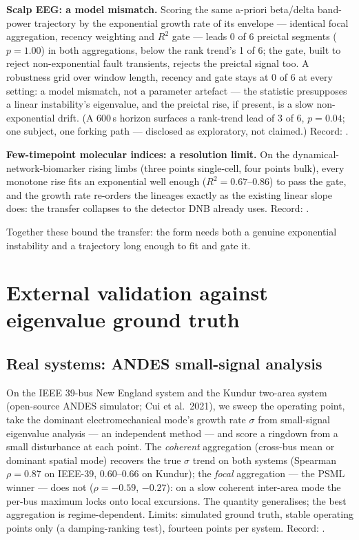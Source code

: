 \documentclass[11pt]{article}
\begin{document}
\textbf{Scalp EEG: a model mismatch.} Scoring the same a-priori
beta/delta band-power trajectory by the exponential growth rate of its
envelope --- identical focal aggregation, recency weighting and $R^2$
gate --- leads 0 of 6 preictal segments ($p = 1.00$) in both
aggregations, below the rank trend's 1 of 6; the gate, built to reject
non-exponential fault transients, rejects the preictal signal too. A
robustness grid over window length, recency and gate stays at 0 of 6 at
every setting: a model mismatch, not a parameter artefact --- the
statistic presupposes a linear instability's eigenvalue, and the
preictal rise, if present, is a slow non-exponential drift. (A 600\,s
horizon surfaces a rank-trend lead of 3 of 6, $p = 0.04$; one subject,
one forking path --- disclosed as exploratory, not claimed.) Record:
.

\textbf{Few-timepoint molecular indices: a resolution limit.} On the
dynamical-network-biomarker rising limbs (three points single-cell,
four points bulk), every monotone rise fits an exponential well enough
($R^2 = 0.67$--$0.86$) to pass the gate, and the growth rate re-orders
the lineages exactly as the existing linear slope does: the transfer
collapses to the detector DNB already uses. Record:
.

Together these bound the transfer: the form needs both a genuine
exponential instability and a trajectory long enough to fit and gate
it.

\section{External validation against eigenvalue ground truth}\label{sec:external}

\subsection{Real systems: ANDES small-signal analysis}\label{sec:andes}

On the IEEE 39-bus New England system and the Kundur two-area system
(open-source ANDES simulator; Cui et al.\ 2021), we sweep the operating
point, take the dominant electromechanical mode's growth rate $\sigma$
from small-signal eigenvalue analysis --- an independent method --- and
score a ringdown from a small disturbance at each point. The
\emph{coherent} aggregation (cross-bus mean or dominant spatial mode)
recovers the true $\sigma$ trend on both systems (Spearman
$\rho = 0.87$ on IEEE-39, 0.60--0.66 on Kundur); the \emph{focal}
aggregation --- the PSML winner --- does not ($\rho = -0.59$, $-0.27$):
on a slow coherent inter-area mode the per-bus maximum locks onto local
excursions. The quantity generalises; the best aggregation is
regime-dependent. Limits: simulated ground truth, stable operating
points only (a damping-ranking test), fourteen points per system.
Record:
.
\end{document}
